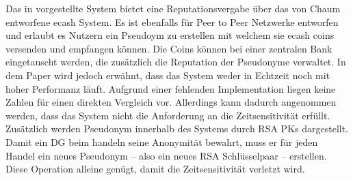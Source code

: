 \documentclass[
	fontsize=11pt,
	headings=small,
	parskip=half,           %
	bibliography=totoc,
	numbers=noenddot,       %
	open=any,               %
]{scrreprt}
\begin{document}
Das in \cite{rep-androulaki2008reputation} vorgestellte System bietet eine Reputationsvergabe über das von Chaum entworfene ecash System. Es ist ebenfalls für Peer to Peer Netzwerke entworfen und erlaubt es Nutzern ein Pseudoym zu erstellen mit welchem sie ecash coins versenden und empfangen können. Die Coins können bei einer zentralen Bank eingetauscht werden, die zusätzlich die Reputation der Pseudonyme verwaltet. In dem Paper wird jedoch erwähnt, dass das System weder in Echtzeit noch mit hoher Performanz läuft. Aufgrund einer fehlenden Implementation liegen keine Zahlen für einen direkten Vergleich vor. Allerdings kann dadurch angenommen werden, dass das System nicht die Anforderung an die Zeitsensitivität erfüllt. Zusätzlich werden Pseudonym innerhalb des Systems durch RSA PKs dargestellt. Damit ein DG beim handeln seine Anonymität bewahrt, muss er für jeden Handel ein neues Pseudonym -- also ein neues RSA Schlüsselpaar -- erstellen. Diese Operation alleine genügt, damit die Zeitsensitivität verletzt wird.

\end{document}
